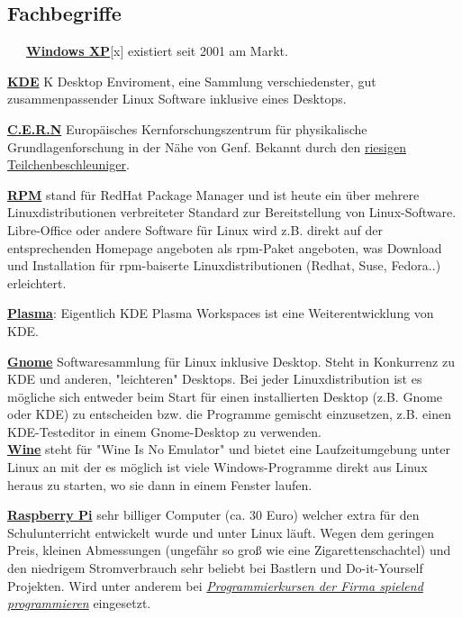 \documentclass[10pt,a4paper,ngerman,twoside]{article} %
\begin{document}
\begin{multicols}{3}
\subsection*{Fachbegriffe}
~~~\href{http://de.wikipedia.org/wiki/Windows_XP}{\textbf{Windows XP}}[x] existiert seit 2001 am Markt. 

\href{http://de.wikipedia.org/wiki/Kde}{\textbf{KDE}} K Desktop Enviroment, eine Sammlung verschiedenster, gut zusammenpassender Linux Software inklusive eines Desktops. 

\href{http://de.wikipedia.org/wiki/Cern}{\textbf{C.E.R.N}} Europäisches Kernforschungszentrum für physikalische Grundlagenforschung in der Nähe von Genf. Bekannt durch den \href{http://de.wikipedia.org/wiki/Large_Hadron_Collider}{riesigen Teilchenbeschleuniger}. 

\href{http://de.wikipedia.org/wiki/RPM_Package_Manager}{\textbf{RPM}} stand für RedHat Package Manager und ist heute ein über mehrere Linuxdistributionen verbreiteter Standard zur Bereitstellung von Linux-Software. Libre-Office oder andere Software für Linux wird z.B. direkt auf der entsprechenden Homepage angeboten als rpm-Paket angeboten, was Download und Installation für rpm-baiserte Linuxdistributionen (Redhat, Suse, Fedora..) erleichtert. 

\href{http://de.wikipedia.org/wiki/KDE_Plasma_Workspaces}{\textbf{Plasma}}: Eigentlich KDE Plasma Workspaces ist eine Weiterentwicklung von KDE. 

\href{http://de.wikipedia.org/wiki/Gnome}{\textbf{Gnome}} Softwaresammlung für Linux inklusive Desktop. Steht in Konkurrenz zu KDE und anderen, "leichteren" Desktops. Bei jeder Linuxdistribution ist es mögliche sich entweder beim Start für einen installierten Desktop (z.B. Gnome oder KDE) zu entscheiden bzw. die Programme gemischt einzusetzen, z.B. einen KDE-Testeditor in einem Gnome-Desktop zu verwenden. \\
\href{http://de.wikipedia.org/wiki/Wine}{\textbf{Wine}} steht für "Wine Is No Emulator" und bietet eine Laufzeitumgebung unter Linux an mit der es möglich ist viele Windows-Programme direkt aus Linux heraus zu starten, wo sie dann in einem Fenster laufen. 

\href{http://de.wikipedia.org/wiki/Raspberry_Pi}{\textbf{Raspberry Pi}} sehr billiger Computer (ca. 30 Euro) welcher extra für den Schulunterricht entwickelt wurde und unter Linux läuft. Wegen dem geringen Preis, kleinen Abmessungen (ungefähr so groß wie eine Zigarettenschachtel) und den niedrigem Stromverbrauch sehr beliebt bei Bastlern und Do-it-Yourself Projekten. Wird unter anderem bei \href{http://spielend-programmieren.at}{\textit{Programmierkursen der Firma spielend programmieren}} eingesetzt. 


\end{multicols}
\end{document}
